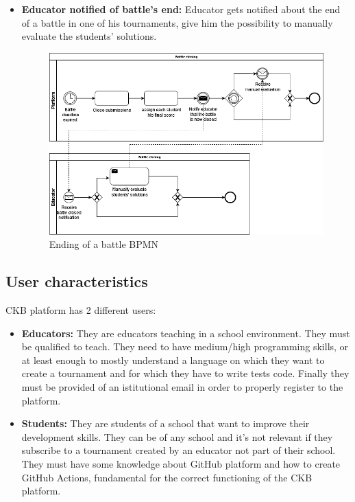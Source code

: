 \documentclass{article}
\begin{document}
{\begin{itemize}
            \item \textbf{Educator notified of battle's end:} Educator gets notified about the end of a battle in one of his tournaments, give him the possibility to manually evaluate the students' solutions.
            \begin{figure}[H]
                \centering
                \includegraphics[scale=0.4]{images/BPMN/BPMN12.png}
                \caption{Ending of a battle BPMN}
                \label{fig:battleEndingBPMN}
            \end{figure}
        \end{itemize}
    
    \subsection{User characteristics}
        CKB platform has 2 different users:
        \begin{itemize}
            \item \textbf{Educators:} They are educators teaching in a school
            environment. They must be qualified to teach. They need to have
            medium/high programming skills, or at least enough to mostly
            understand a language on which they want to create a tournament and
            for which they have to write tests code.
            Finally they must be provided of an istitutional email in order to properly
            register to the platform.
            \item \textbf{Students:} They are students of a school that want to
            improve their development skills. They can be of any school and it's
            not relevant if they subscribe to a tournament created by an educator
            not part of their school. They must have some knowledge about GitHub
            platform and how to create GitHub Actions, fundamental for the correct
            functioning of the CKB platform.
        \end{itemize}
}
\end{document}
